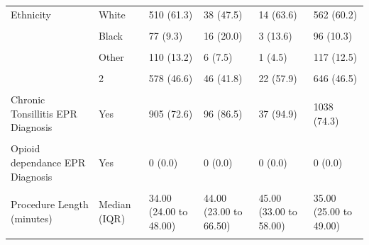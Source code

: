\documentclass[
  letterpaper,
  DIV=11,
  numbers=noendperiod]{scrreprt}
\begin{document}
\begin{table}
{\begin{tabular*}{\linewidth}{@{\extracolsep{\fill}}llllll}
{Ethnicity} & {White} & {510 (61.3)} & {38 (47.5)} & {14 (63.6)} & {562 (60.2)} \\ 
{\cellcolor[HTML]{F2F2F2}{}} & {\cellcolor[HTML]{F2F2F2}{Asian}} & {\cellcolor[HTML]{F2F2F2}{86 (10.3)}} & {\cellcolor[HTML]{F2F2F2}{15 (18.8)}} & {\cellcolor[HTML]{F2F2F2}{2 (9.1)}} & {\cellcolor[HTML]{F2F2F2}{103 (11.0)}} \\ 
 & Black & {77 (9.3)} & 16 (20.0) & 3 (13.6) & 96 (10.3) \\ 
{\cellcolor[HTML]{F2F2F2}{}} & {\cellcolor[HTML]{F2F2F2}{Mixed}} & {\cellcolor[HTML]{F2F2F2}{49 (5.9)}} & {\cellcolor[HTML]{F2F2F2}{5 (6.2)}} & {\cellcolor[HTML]{F2F2F2}{2 (9.1)}} & {\cellcolor[HTML]{F2F2F2}{56 (6.0)}} \\ 
 & Other & {110 (13.2)} & 6 (7.5) & 1 (4.5) & 117 (12.5) \\ 
{\cellcolor[HTML]{F2F2F2}{ASA physical status}} & {\cellcolor[HTML]{F2F2F2}{1}} & {\cellcolor[HTML]{F2F2F2}{587 (47.3)}} & {\cellcolor[HTML]{F2F2F2}{56 (50.9)}} & {\cellcolor[HTML]{F2F2F2}{13 (34.2)}} & {\cellcolor[HTML]{F2F2F2}{656 (47.3)}} \\ 
 & 2 & {578 (46.6)} & 46 (41.8) & 22 (57.9) & 646 (46.5) \\ 
{\cellcolor[HTML]{F2F2F2}{}} & {\cellcolor[HTML]{F2F2F2}{3}} & {\cellcolor[HTML]{F2F2F2}{75 (6.0)}} & {\cellcolor[HTML]{F2F2F2}{8 (7.3)}} & {\cellcolor[HTML]{F2F2F2}{3 (7.9)}} & {\cellcolor[HTML]{F2F2F2}{86 (6.2)}} \\ 
{Chronic Tonsillitis EPR Diagnosis} & {Yes} & {905 (72.6)} & {96 (86.5)} & {37 (94.9)} & {1038 (74.3)} \\ 
{\cellcolor[HTML]{F2F2F2}{Obstructive Sleep Apnoea EPR Diagnosis}} & {\cellcolor[HTML]{F2F2F2}{Yes}} & {\cellcolor[HTML]{F2F2F2}{175 (14.0)}} & {\cellcolor[HTML]{F2F2F2}{13 (11.7)}} & {\cellcolor[HTML]{F2F2F2}{13 (33.3)}} & {\cellcolor[HTML]{F2F2F2}{201 (14.4)}} \\ 
{Opioid dependance EPR Diagnosis} & {Yes} & {0 (0.0)} & {0 (0.0)} & {0 (0.0)} & {0 (0.0)} \\ 
{\cellcolor[HTML]{F2F2F2}{Chronic Pain EPR Diagnosis}} & {\cellcolor[HTML]{F2F2F2}{Yes}} & {\cellcolor[HTML]{F2F2F2}{6 (0.5)}} & {\cellcolor[HTML]{F2F2F2}{0 (0.0)}} & {\cellcolor[HTML]{F2F2F2}{0 (0.0)}} & {\cellcolor[HTML]{F2F2F2}{6 (0.4)}} \\ 
{Procedure Length (minutes)} & {Median (IQR)} & {34.00 (24.00 to 48.00)} & {44.00 (23.00 to 66.50)} & {45.00 (33.00 to 58.00)} & {35.00 (25.00 to 49.00)} \\ 
{\cellcolor[HTML]{F2F2F2}{Coblation technique}} & {\cellcolor[HTML]{F2F2F2}{Yes}} & {\cellcolor[HTML]{F2F2F2}{38 (3.0)}} & {\cellcolor[HTML]{F2F2F2}{1 (0.9)}} & {\cellcolor[HTML]{F2F2F2}{4 (10.3)}} & {\cellcolor[HTML]{F2F2F2}{43 (3.1)}} \\ 
\bottomrule
\end{tabular*}

}

\end{table}%
\end{document}

